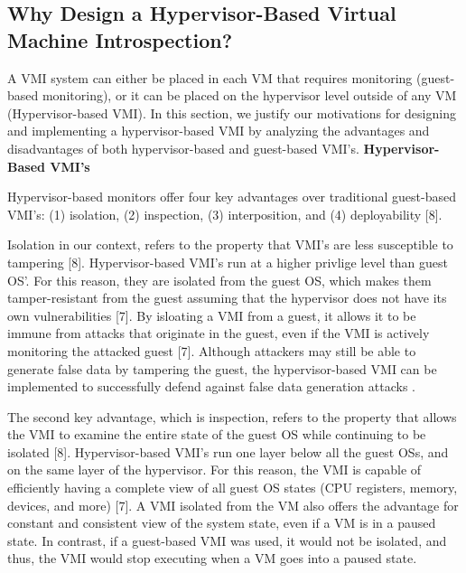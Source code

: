 \documentclass{report}
\begin{document}
\begin{spacing}{1.5}
\subsection{Why Design a Hypervisor-Based Virtual Machine Introspection?}

{\large
A VMI system can either be placed in each VM that requires monitoring (guest-based monitoring), or it can be placed on the hypervisor level outside of any VM (Hypervisor-based VMI). In this section, we justify our motivations for designing and implementing a hypervisor-based VMI by analyzing the advantages and disadvantages of both hypervisor-based and guest-based VMI's. 
\newline \newline
\textbf{Hypervisor-Based VMI's}
\newline
}

{\large
Hypervisor-based monitors offer four key advantages over traditional guest-based VMI's: (1) isolation, (2) inspection, (3) interposition, and (4) deployability [8].
\newline
}

{\large
Isolation in our context, refers to the property that VMI's are less susceptible to tampering [8]. Hypervisor-based VMI's run at a higher privlige level than guest OS'. For this reason, they are isolated from the guest OS, which makes them tamper-resistant from the guest assuming that the hypervisor does not have its own vulnerabilities [7]. By isloating a VMI from a guest, it allows it to be immune from attacks that originate in the guest, even if the VMI is actively monitoring the attacked guest [7]. Although attackers may still be able to generate false data by tampering the guest, the hypervisor-based VMI can be implemented to successfully defend against false data generation attacks .
\newline
}

{\large
The second key advantage, which is inspection, refers to the property that allows the VMI to examine the entire state of the guest OS while continuing to be isolated [8]. Hypervisor-based VMI's run one layer below all the guest OSs, and on the same layer of the hypervisor. For this reason, the VMI is capable of efficiently having a complete view of all guest OS states (CPU registers, memory, devices, and more) [7]. A VMI isolated from the VM also offers the advantage for constant and consistent view of the system state, even if a VM is in a paused state. In contrast, if a guest-based VMI  was used, it would not be isolated, and thus, the VMI would stop executing when a VM goes into a paused state. 
\newline
}



\end{spacing}
\end{document}

